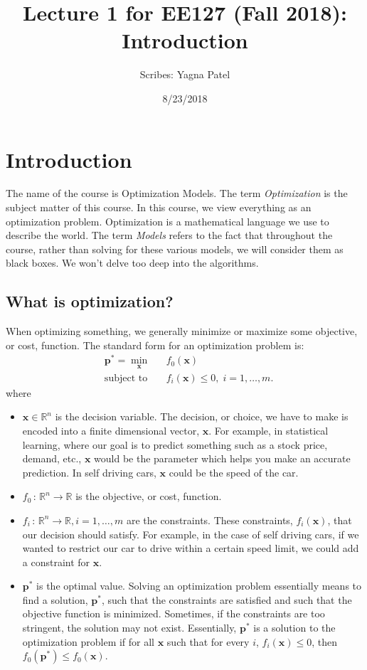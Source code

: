 \documentclass[12pt]{article}
\title{Lecture 1 for EE127 (Fall 2018): Introduction}
\author{Scribes: Yagna Patel}
\date{8/23/2018}
\begin{document}
\maketitle
\section{Introduction}
The name of the course is Optimization Models. The term \textit{Optimization} is the subject matter of this course. In this course, we view everything as an optimization problem. Optimization is a mathematical language we use to describe the world. The term \textit{Models} refers to the fact that throughout the course, rather than solving for these various models, we will consider them as black boxes. We won't delve too deep into the algorithms. 

\subsection{What is optimization?}
When optimizing something, we generally minimize or maximize some objective, or cost, function. The standard form for an optimization problem is:
\begin{equation*}
\begin{aligned}& \mathbf{p}^*=\underset{\mathbf{x}}{\min}& & f_0(\mathbf{x}) \\& \text{subject to}& & f_i(\mathbf{x}) \leqslant 0, \; i = 1, \ldots, m.\end{aligned}\tag{1}\end{equation*}
where 
\begin{itemize}
\item $\mathbf{x}\in\mathbb{R}^n$ is the decision variable. The decision, or choice, we have to make is encoded into a finite dimensional vector, $\mathbf{x}$. For example, in statistical learning, where our goal is to predict something such as a stock price, demand, etc., $\mathbf{x}$ would be the parameter which helps you make an accurate prediction. In self driving cars, $\mathbf{x}$ could be the speed of the car. 
\item $f_0\,:\,\mathbb{R}^n\to\mathbb{R}$ is the objective, or cost, function. 
\item $f_i\,:\,\mathbb{R}^n\to\mathbb{R}, i=1,\ldots, m$ are the constraints. These constraints, $f_i(\mathbf{x})$, that our decision should satisfy. For example, in the case of self driving cars, if we wanted to restrict our car to drive within a certain speed limit, we could add a constraint for $\mathbf{x}$. 
\item $\mathbf{p}^*$ is the optimal value. Solving an optimization problem essentially means to find a solution, $\mathbf{p}^*$, such that the constraints are satisfied and such that the objective function is minimized. Sometimes, if the constraints are too stringent, the solution may not exist. Essentially, $\mathbf{p}^*$ is a solution to the optimization problem if for all $\mathbf{x}$ such that for every $i$, $f_i(\mathbf{x}) \leqslant 0$, then $f_0(\mathbf{p}^*)\leqslant f_0(\mathbf{x})$.
\end{itemize}
\end{document}
